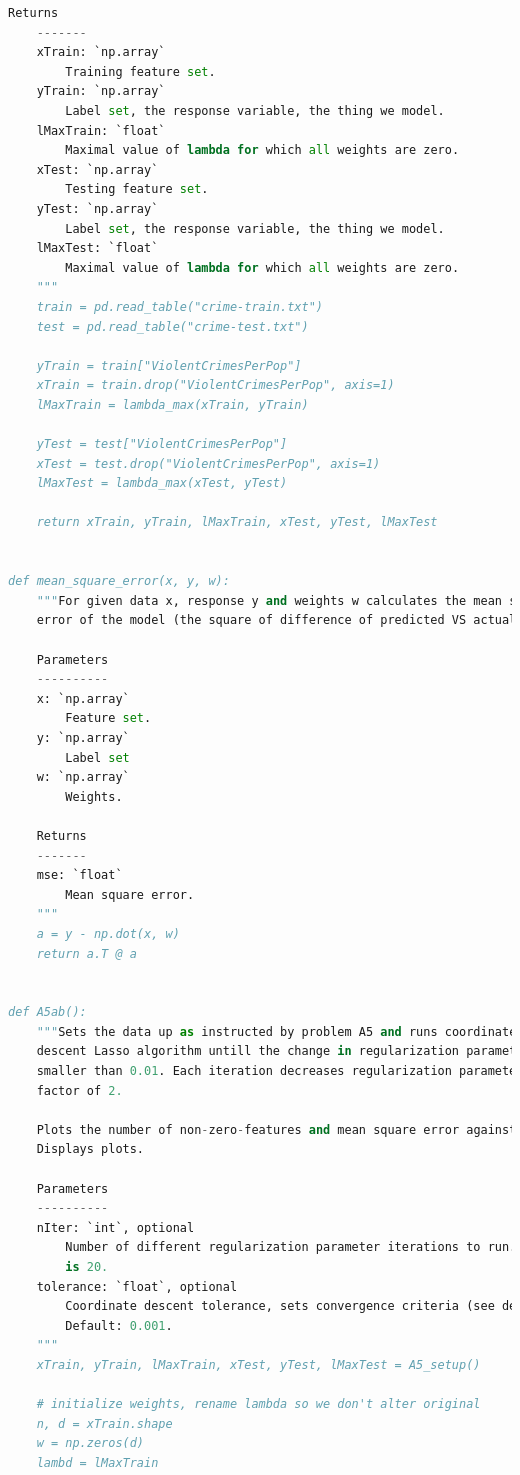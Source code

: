 \documentclass{article}
\newcommand{\1}{\mathbf{1}}
\begin{document}
\begin{enumerate}
\begin{lstlisting}[language=Python]
    Returns
    -------
    xTrain: `np.array`
        Training feature set.
    yTrain: `np.array`
        Label set, the response variable, the thing we model.
    lMaxTrain: `float`
        Maximal value of lambda for which all weights are zero.
    xTest: `np.array`
        Testing feature set.
    yTest: `np.array`
        Label set, the response variable, the thing we model.
    lMaxTest: `float`
        Maximal value of lambda for which all weights are zero.
    """
    train = pd.read_table("crime-train.txt")
    test = pd.read_table("crime-test.txt")

    yTrain = train["ViolentCrimesPerPop"]
    xTrain = train.drop("ViolentCrimesPerPop", axis=1)
    lMaxTrain = lambda_max(xTrain, yTrain)

    yTest = test["ViolentCrimesPerPop"]
    xTest = test.drop("ViolentCrimesPerPop", axis=1)
    lMaxTest = lambda_max(xTest, yTest)

    return xTrain, yTrain, lMaxTrain, xTest, yTest, lMaxTest


def mean_square_error(x, y, w):
    """For given data x, response y and weights w calculates the mean square
    error of the model (the square of difference of predicted VS actual).

    Parameters
    ----------
    x: `np.array`
        Feature set.
    y: `np.array`
        Label set
    w: `np.array`
        Weights.

    Returns
    -------
    mse: `float`
        Mean square error.
    """
    a = y - np.dot(x, w)
    return a.T @ a


def A5ab():
    """Sets the data up as instructed by problem A5 and runs coordinate
    descent Lasso algorithm untill the change in regularization parameter is
    smaller than 0.01. Each iteration decreases regularization parameter by a
    factor of 2.

    Plots the number of non-zero-features and mean square error against lambda.
    Displays plots.

    Parameters
    ----------
    nIter: `int`, optional
        Number of different regularization parameter iterations to run. Default
        is 20.
    tolerance: `float`, optional
        Coordinate descent tolerance, sets convergence criteria (see descent).
        Default: 0.001.
    """
    xTrain, yTrain, lMaxTrain, xTest, yTest, lMaxTest = A5_setup()

    # initialize weights, rename lambda so we don't alter original
    n, d = xTrain.shape
    w = np.zeros(d)
    lambd = lMaxTrain


\end{lstlisting}
\end{enumerate}
\end{document}
